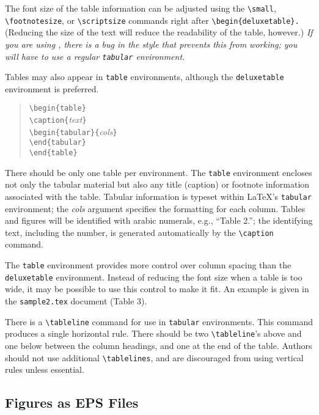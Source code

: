 \documentclass[11pt,twoside]{article}
\def\arg#1{{\it#1\/}}
\begin{document}
The font size of the table information
can be adjusted using the \verb+\small+, \verb+\footnotesize+, or
\verb+\scriptsize+ commands right after \verb+\begin{deluxetable}.+
(Reducing the size of the text will reduce the readability
of the table, however.)  {\em If you are using \LaTeXe, there is a bug in
the style that prevents this from working; you will have to use a
regular \verb+tabular+ environment.}

Tables may also appear in \verb+table+ environments, although the 
\verb+deluxetable+ environment is preferred.
\begin{quote}
\verb+\begin{table}+\\
\verb+\caption{+\arg{text}\verb+}+\\
\verb+\begin{tabular}{+\arg{cols}\verb+}+\\
\verb+\end{tabular}+\\
\verb+\end{table}+
\end{quote}
There should be only one table per environment. The \verb+table+
environment encloses not only the tabular material but also any title
(caption) or footnote information associated with the table. Tabular
information is typeset within \LaTeX's {\tt tabular} environment;
the \arg{cols} argument specifies the formatting for each column.
Tables and figures will be identified with arabic numerals, e.g.,
``Table 2.''; the identifying text, including the number, is generated
automatically by the \verb+\caption+ command.

The {\tt table} environment provides more control over column spacing
than the {\tt deluxetable} environment.  Instead of reducing the font
size when a table is too wide, it may be possible to use this control to
make it fit.  An example is given in the {\tt sample2.tex} document
(Table 3).

There is a \verb+\tableline+ command for use in {\tt tabular}
environments.  This command produces a single horizontal rule.
There should be two \verb+\tableline+'s above and one below between
the column headings, and one at the end of the table.  Authors should
not use additional \verb+\tablelines+, and are discouraged from using
vertical rules unless essential.

\subsection{Figures as EPS Files}
\label{figures}
\end{document}
